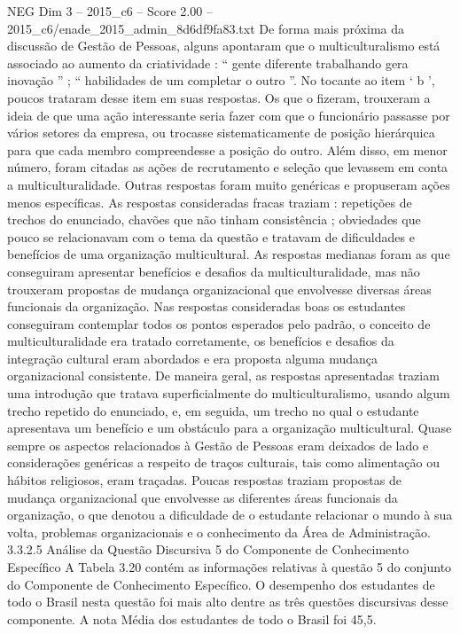\begin{textsample}{NEG Dim 3 – 2015\_c6 – Score 2.00 – 2015\_c6/enade\_2015\_admin\_8d6df9fa83.txt}
De forma mais próxima da discussão de Gestão de Pessoas, alguns apontaram que o multiculturalismo está associado ao aumento da criatividade : “ gente diferente trabalhando gera inovação ” ; “ habilidades de um completar o outro ”.
No tocante ao item ‘ b ’, poucos trataram desse item em suas respostas.
Os que o fizeram, trouxeram a ideia de que uma ação interessante seria fazer com que o funcionário passasse por vários setores da empresa, ou trocasse sistematicamente de posição hierárquica para que cada membro compreendesse a posição do outro.
Além disso, em menor número, foram citadas as ações de recrutamento e seleção que levassem em conta a multiculturalidade.
Outras respostas foram muito genéricas e propuseram ações menos específicas.
As respostas consideradas fracas traziam : repetições de trechos do enunciado, chavões que não tinham consistência ; obviedades que pouco se relacionavam com o tema da questão e tratavam de dificuldades e benefícios de uma organização multicultural.
As respostas medianas foram as que conseguiram apresentar benefícios e desafios da multiculturalidade, mas não trouxeram propostas de mudança organizacional que envolvesse diversas áreas funcionais da organização.
Nas respostas consideradas boas os estudantes conseguiram contemplar todos os pontos esperados pelo padrão, o conceito de multiculturalidade era tratado corretamente, os benefícios e desafios da integração cultural eram abordados e era proposta alguma mudança organizacional consistente.
De maneira geral, as respostas apresentadas traziam uma introdução que tratava superficialmente do multiculturalismo, usando algum trecho repetido do enunciado, e, em seguida, um trecho no qual o estudante apresentava um benefício e um obstáculo para a organização multicultural.
Quase sempre os aspectos relacionados à Gestão de Pessoas eram deixados de lado e considerações genéricas a respeito de traços culturais, tais como alimentação ou hábitos religiosos, eram traçadas.
Poucas respostas traziam propostas de mudança organizacional que envolvesse as diferentes áreas funcionais da organização, o que denotou a dificuldade de o estudante relacionar o mundo à sua volta, problemas organizacionais e o conhecimento da Área de Administração. 3.3.2.5 Análise da Questão Discursiva 5 do Componente de Conhecimento Específico A Tabela 3.20 contém as informações relativas à questão 5 do conjunto do Componente de Conhecimento Específico.
O desempenho dos estudantes de todo o Brasil nesta questão foi mais alto dentre as três questões discursivas desse componente.
A nota Média dos estudantes de todo o Brasil foi 45,5.

\end{textsample}
